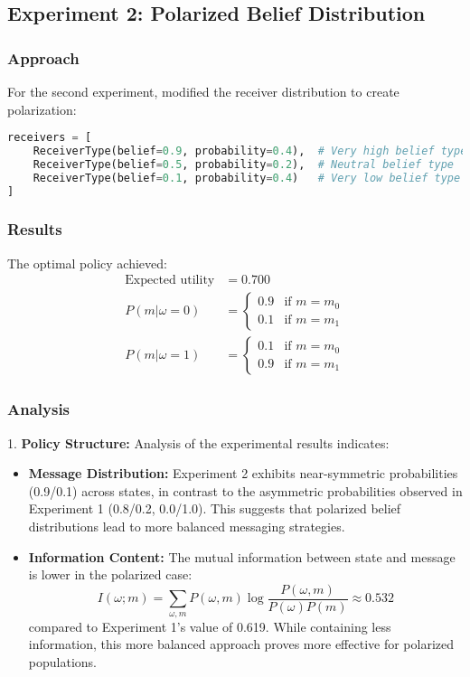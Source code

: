 \documentclass[12pt]{article}
\theoremstyle{plain}
\theoremstyle{definition}
\theoremstyle{remark}
\begin{document}
\subsection{Experiment 2: Polarized Belief Distribution}

\subsubsection{Approach}
For the second experiment, modified the receiver distribution to create polarization:

\begin{lstlisting}[language=Python, caption=Experiment 2 Setup]
receivers = [
    ReceiverType(belief=0.9, probability=0.4),  # Very high belief type
    ReceiverType(belief=0.5, probability=0.2),  # Neutral belief type
    ReceiverType(belief=0.1, probability=0.4)   # Very low belief type
]
\end{lstlisting}

\subsubsection{Results}
The optimal policy achieved:
\begin{align*}
    \text{Expected utility} &= 0.700 \\
    P(m|\omega=0) &= \begin{cases}
        0.9 & \text{if } m = m_0 \\
        0.1 & \text{if } m = m_1
    \end{cases} \\
    P(m|\omega=1) &= \begin{cases}
        0.1 & \text{if } m = m_0 \\
        0.9 & \text{if } m = m_1
    \end{cases}
\end{align*}

\subsubsection{Analysis}
1. \textbf{Policy Structure:} Analysis of the experimental results indicates:
\begin{itemize}
    \item \textbf{Message Distribution:} Experiment 2 exhibits near-symmetric probabilities (0.9/0.1) across states, in contrast to the asymmetric probabilities observed in Experiment 1 (0.8/0.2, 0.0/1.0). This suggests that polarized belief distributions lead to more balanced messaging strategies.
    
    \item \textbf{Information Content:} The mutual information between state and message is lower in the polarized case:
    \[I(\omega;m) = \sum_{\omega,m} P(\omega,m)\log\frac{P(\omega,m)}{P(\omega)P(m)} \approx 0.532\]
    compared to Experiment 1's value of 0.619. While containing less information, this more balanced approach proves more effective for polarized populations.
\end{itemize}
\end{document}
